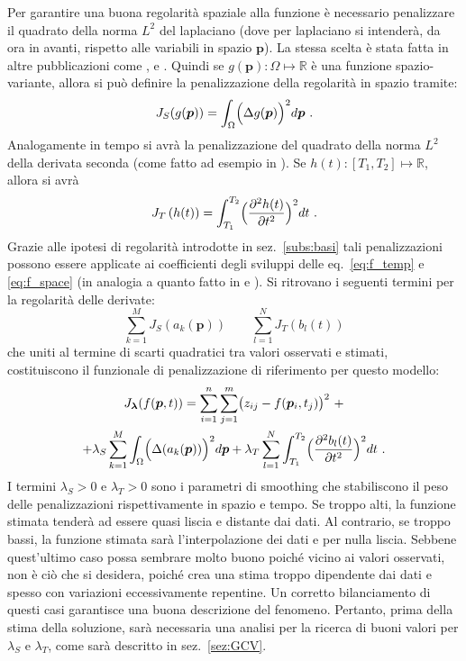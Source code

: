 \documentclass[a4paper,11pt,twoside,openright]{book}							%
\begin{document}
Per garantire una buona regolarità spaziale alla funzione è necessario penalizzare il quadrato della norma $L^2$ del laplaciano (dove per laplaciano si intenderà, da ora in avanti, rispetto alle variabili in spazio $\bm p$). La stessa scelta è stata fatta in altre pubblicazioni come \cite{art:ramsay}, \cite{art:sangalli} e \cite{art:wood}. Quindi se $g(\bm p): \Omega \mapsto \mathbb{R}$ è una funzione spazio-variante, allora si può definire la penalizzazione della regolarità in spazio tramite:
$$
J_S(g(\bm p))=\int_{\Omega} \Bigl( \Delta  g(\bm p  ) \Bigr)^2 d \bm p \ .
$$
Analogamente in tempo si avrà la penalizzazione del quadrato della norma $L^2$ della derivata seconda (come fatto ad esempio in \cite{art:ramsaysilverman}). Se $h(t): [T_1,T_2] \mapsto \mathbb{R}$, allora si avrà
$$
J_T\left(h(t)\right)=\int_{T_1}^{T_2} \Bigl( \frac{\partial^2   h(t)   }{\partial t ^2} \Bigr)^2 dt\ .
$$
Grazie alle ipotesi di regolarità introdotte in sez.~\ref{subs:basi} tali penalizzazioni possono essere applicate ai coefficienti degli sviluppi delle eq.~\eqref{eq:f_temp} e \eqref{eq:f_space} (in analogia a quanto fatto in \cite{art:augustin} e \cite{art:marra}). Si ritrovano i seguenti termini per la regolarità delle derivate:
\begin{equation*}
\sum_{k=1}^M J_S( a_k(\bm p)) \qquad \sum_{l=1}^N J_T ( b_l(t)) 
\end{equation*}
che uniti al termine di scarti quadratici tra valori osservati e stimati, costituiscono il funzionale di penalizzazione di riferimento per questo modello:
\begin{multline}
\label{eq:penalizzdisc}
J_{\bm \lambda }(f(\bm p,t))=\sum_{i=1}^n \sum_{j=1}^m \bigl( z_{ij} - f(\bm p_i,t_j) \bigr)^2 \ + \\
+\lambda_S  \sum_{k=1}^M \int_{\Omega} \Bigl( \Delta(  a_k(\bm p)  ) \Bigr)^2 d \bm p + \lambda_T \sum_{l=1}^N\int_{T_1}^{T_2} \Bigl( \frac{\partial^2   b_l(t)   }{\partial t ^2} \Bigr)^2 dt \ .
\end{multline}
I termini $\lambda_S>0$ e $\lambda_T>0$ sono i parametri di smoothing che stabiliscono il peso delle penalizzazioni rispettivamente in spazio e tempo. Se troppo alti, la funzione stimata tenderà ad essere quasi liscia e distante dai dati. Al contrario, se troppo bassi, la funzione stimata sarà l'interpolazione dei dati e per nulla liscia. Sebbene quest'ultimo caso possa sembrare molto buono poiché vicino ai valori osservati, non è ciò che si desidera, poiché crea una stima troppo dipendente dai dati e spesso con variazioni eccessivamente repentine. Un corretto bilanciamento di questi casi garantisce una buona descrizione del fenomeno. Pertanto, prima della stima della soluzione, sarà necessaria una analisi per la ricerca di buoni valori per $\lambda_S$ e $\lambda_T$, come sarà descritto in sez.~\ref{sez:GCV}.
\end{document}

